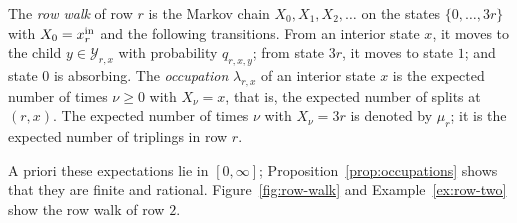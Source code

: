 \begin{definition}\label{def:row-walk}
The \emph{row walk} of row \(r\) is the Markov chain
\(X_0,X_1,X_2,\ldots\) on the states \(\{0,\ldots,3r\}\) with
\(X_0=x^{\mathrm{in}}_r\) and the following transitions. From an interior state
\(x\), it moves to the child \(y\in\mathcal Y_{r,x}\) with probability
\(q_{r,x,y}\); from state \(3r\), it moves to state \(1\); and state \(0\)
is absorbing. The \emph{occupation} \(\lambda_{r,x}\) of an interior
state \(x\) is the expected number of times \(\nu\ge0\) with
\(X_\nu=x\), that is, the expected number of splits at \((r,x)\). The
expected number of times \(\nu\) with \(X_\nu=3r\) is denoted by
\(\mu_r\); it is the expected number of triplings in row \(r\).
\end{definition}

A priori these expectations lie in \([0,\infty]\);
Proposition~\ref{prop:occupations} shows that they are finite and
rational. Figure~\ref{fig:row-walk} and Example~\ref{ex:row-two} show the
row walk of row \(2\).

